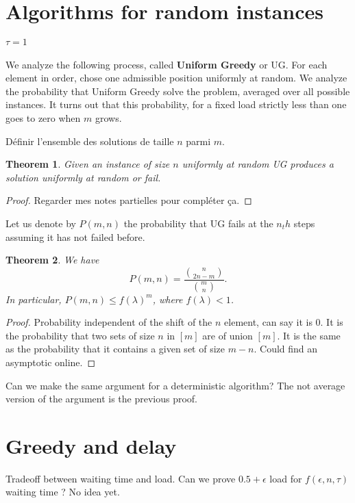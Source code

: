 \documentclass[10pt, conference, letterpaper]{IEEEtran}
\newtheorem{theorem}{Theorem}
\begin{document}
\section{Algorithms for random instances}

\paragraph{$\tau = 1$}

We analyze the following process, called \textbf{Uniform Greedy} or UG.
For each element in order, chose one admissible position
uniformly at random. We analyze the probability that Uniform Greedy
solve the problem, averaged over all possible instances. 
It turns out that this probability, for a fixed load strictly less than one goes to zero when $m$ grows. 

Définir l'ensemble des solutions de taille $n$ parmi $m$.
\begin{theorem}
Given an instance of size $n$ uniformly at random UG
produces a solution uniformly at random or fail.
\end{theorem}
\begin{proof}
Regarder mes notes partielles pour compléter ça.
\end{proof}

Let us denote by $P(m,n)$ the probability that UG fails at the $n_th$
steps assuming it has not failed before.

\begin{theorem}
We have $$P(m,n) = \frac{\binom{n}{2n-m}}{\binom{m}{n}}.$$
In particular, $P(m,n) \leq f(\lambda)^m$, where $f(\lambda) < 1$.
\end{theorem}
\begin{proof}
Probability independent of the shift of the $n$ element, can say it is $0$.
It is the probability that two sets of size $n$ in $[m]$ are of union $[m]$.
It is the same as the probability that it contains a given set of size $m-n$.
Could find an asymptotic online.
\end{proof}

Can we make the same argument for a deterministic algorithm?
The not average version of the argument is the previous proof.

\section{Greedy and delay}

Tradeoff between waiting time and load. Can we prove $0.5 + \epsilon$ load for $f(\epsilon,n,\tau)$ waiting time ?  No idea yet.
\end{document}
